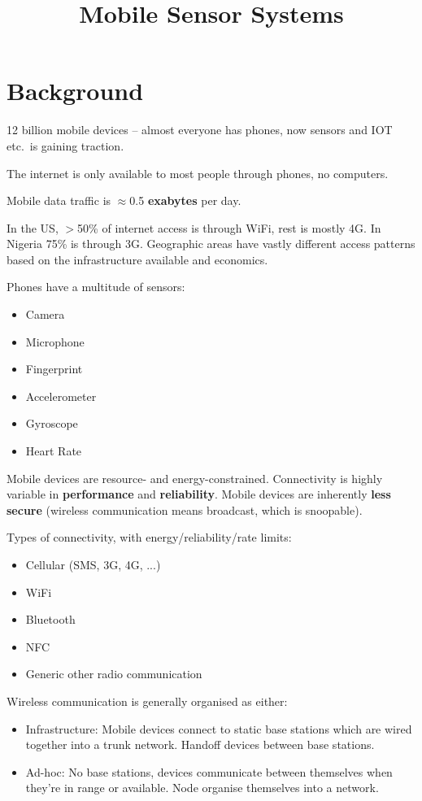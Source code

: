 \documentclass[a4paper, 11pt]{article}
\title{\vspace{-2cm}Mobile Sensor Systems\vspace{-1.5cm}}
\author{}
\date{}
\begin{document}
\maketitle

\section*{Background}
{
    12 billion mobile devices -- almost everyone has phones, now sensors and IOT etc.\ is gaining traction.

    The internet is only available to most people through phones, no computers.

    Mobile data traffic is \(\approx\)0.5 \textbf{exabytes} per day.

    In the US, \(>\)50\% of internet access is through WiFi, rest is mostly 4G. In Nigeria 75\% is through 3G. Geographic areas have vastly different access patterns based on the infrastructure available and economics.

    Phones have a multitude of sensors:
    \begin{itemize}
    \item Camera
    \item Microphone
    \item Fingerprint
    \item Accelerometer
    \item Gyroscope
    \item Heart Rate
    \end{itemize}

    Mobile devices are resource- and energy-constrained. Connectivity is highly variable in \textbf{performance} and \textbf{reliability}. Mobile devices are inherently \textbf{less secure} (wireless communication means broadcast, which is snoopable).

    Types of connectivity, with energy/reliability/rate limits:
    \begin{itemize}
    \item Cellular (SMS, 3G, 4G, ...)
    \item WiFi
    \item Bluetooth
    \item NFC
    \item Generic other radio communication
    \end{itemize}

    Wireless communication is generally organised as either:
    \begin{itemize}
    \item Infrastructure: Mobile devices connect to static base stations which are wired together into a trunk network. Handoff devices between base stations.
    \item Ad-hoc: No base stations, devices communicate between themselves when they're in range or available. Node organise themselves into a network.
    \end{itemize}

}
\end{document}
